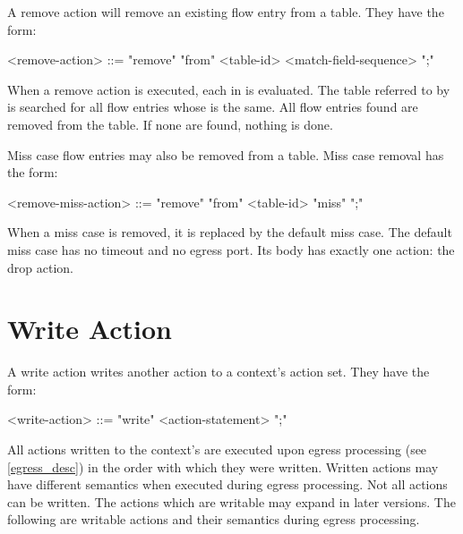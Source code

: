 A remove action will remove an existing flow entry from a table. They have the form:

\begin{minip}
\begin{grammar}
<remove-action> ::= "remove" "from" <table-id> <match-field-sequence> ";"
\end{grammar}
\end{minip}

When a remove action is executed, each  in  is evaluated. The table referred to by  is searched for all flow entries whose  is the same. All flow entries found are removed from the table. If none are found, nothing is done.

Miss case flow entries may also be removed from a table. Miss case removal has the form: 

\begin{minip}
\begin{grammar}
<remove-miss-action> ::= "remove" "from" <table-id> "miss" ";"
\end{grammar}
\end{minip}

When a miss case is removed, it is replaced by the default miss case. The default miss case has no timeout and no egress port. Its body has exactly one action: the drop action.

\section{Write Action} \label{guide:write}

A write action writes another action to a context's action set. They have the form:

\begin{minip}
\begin{grammar}
<write-action> ::= "write" <action-statement> ";"
\end{grammar}
\end{minip}

All actions written to the context's are executed upon egress processing (see \ref{egress_desc}) in the order with which they were written. Written actions may have different semantics when executed during egress processing. Not all actions can be written. The actions which are writable may expand in later versions. The following are writable actions and their semantics during egress processing.

